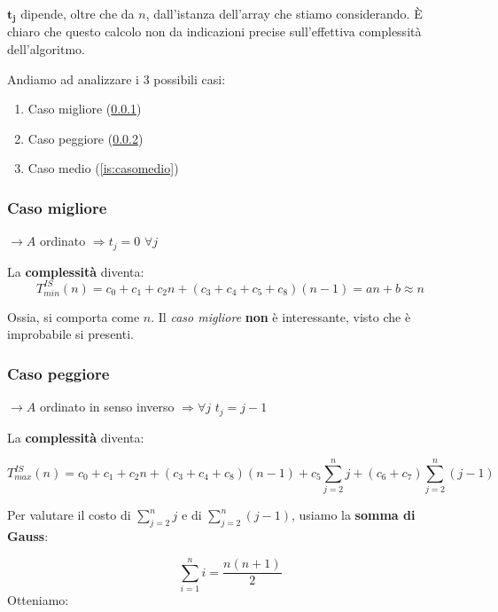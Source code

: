 $\boldsymbol{t_j}$ dipende, oltre che da $n$, dall'istanza dell'array
che stiamo considerando.
È chiaro che questo calcolo non da indicazioni precise sull'effettiva
complessità dell'algoritmo.\par

\bigskip
Andiamo ad analizzare i 3 possibili casi:

\begin{enumerate}[label=\emph{\alph*})]
    \item Caso migliore (\ref{is:casomigliore})
    \item Caso peggiore (\ref{is:casopeggiore})
    \item Caso medio (\ref{is:casomedio})
\end{enumerate}

\subsubsection{Caso migliore} \label{is:casomigliore}

$\rightarrow A$ ordinato $\Rightarrow t_j = 0 $ $\forall j$

\bigskip
La \textbf{complessità} diventa:
\begin{displaymath}
    T^{IS}_{min}(n) = c_0 + c_1 + c_2n + (c_3+c_4+c_5+c_8)(n-1) 
    = an+b \approx n
\end{displaymath}

Ossia, si comporta come $n$. Il \emph{caso migliore} \textbf{non}
è interessante, visto che è improbabile si presenti.

\subsubsection{Caso peggiore} \label{is:casopeggiore}

$\rightarrow A$ ordinato in senso inverso $\Rightarrow \forall j$ $t_j = j-1$ \par
\bigskip
La \textbf{complessità} diventa: 

\begin{displaymath}
    T^{IS}_{max}(n) = c_0 + c_1 + c_2n + (c_3+c_4+c_8)(n-1)
    + c_5\displaystyle\sum_{j=2}^{n}j + (c_6+c_7)
    \displaystyle\sum_{j=2}^{n}(j-1)
\end{displaymath}

Per valutare il costo di $\displaystyle\sum_{j=2}^{n}j$ e di 
$\displaystyle\sum_{j=2}^{n}(j-1)$, usiamo la \textbf{somma di Gauss}: \par

\begin{equation}
    \displaystyle\sum_{i=1}^{n}i = \frac{n(n+1)}{2}
\end{equation}
\newpage
Otteniamo:

